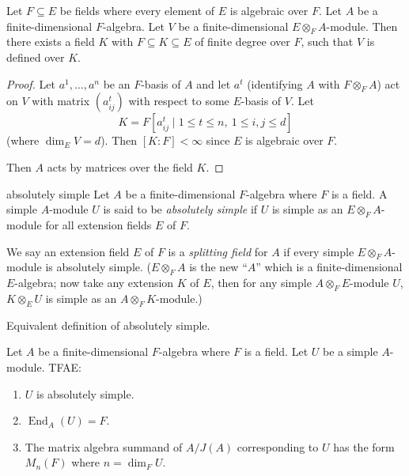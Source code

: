 \documentclass[11pt, a4paper]{report}
\begin{document}
Let $F \subseteq E$ be fields where every element of $E$ is algebraic over $F$. Let $A$ be a finite-dimensional $F$-algebra. Let $V$ be a finite-dimensional $E \otimes_F A$-module. Then there exists a field $K$ with $F \subseteq K \subseteq E$ of finite degree over $F$, such that $V$ is defined over $K$.

\begin{proof}
Let $a^1, \ldots, a^n$ be an $F$-basis of $A$ and let $a^t$ (identifying $A$ with $F \otimes_F A$) act on $V$ with matrix $(a_{ij}^t)$ with respect to some $E$-basis of $V$. Let
\[
K = F\left[a_{ij}^t \mid 1 \leq t \leq n,\ 1 \leq i, j \leq d\right]
\]
(where $\dim_E V = d$). Then $[K:F] < \infty$ since $E$ is algebraic over $F$.

Then $A$ acts by matrices over the field $K$.
\end{proof}

\begin{definition}
absolutely simple
Let $A$ be a finite-dimensional $F$-algebra where $F$ is a field. A simple $A$-module $U$ is said to be \emph{absolutely simple} if $U$ is simple as an $E \otimes_F A$-module for all extension fields $E$ of $F$.

We say an extension field $E$ of $F$ is a \emph{splitting field} for $A$ if every simple $E \otimes_F A$-module is absolutely simple. ($E \otimes_F A$ is the new ``$A$'' which is a finite-dimensional $E$-algebra; now take any extension $K$ of $E$, then for any simple $A \otimes_F E$-module $U$, $K \otimes_E U$ is simple as an $A \otimes_F K$-module.)

\end{definition}

\begin{definition}
\end{definition}

\begin{proposition}
Equivalent definition of absolutely simple.

Let $A$ be a finite-dimensional $F$-algebra where $F$ is a field. Let $U$ be a simple $A$-module. TFAE:
\begin{enumerate}
\item $U$ is absolutely simple.
\item $\operatorname{End}_A(U) = F$.
\item The matrix algebra summand of $A/J(A)$ corresponding to $U$ has the form $M_n(F)$ where $n = \dim_F U$.
\end{enumerate}
\end{proposition}
\end{document}
